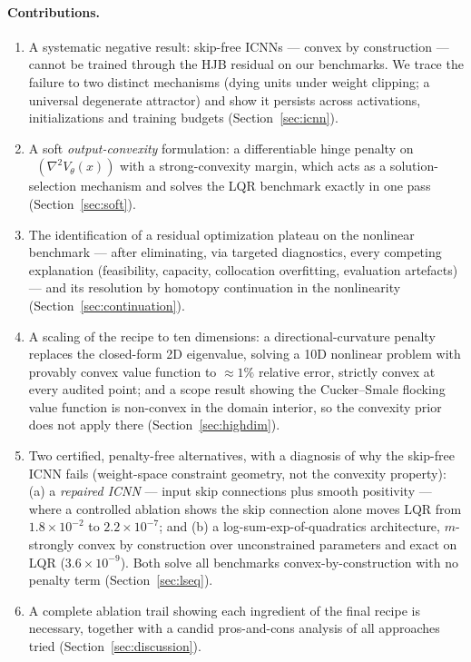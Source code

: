 \documentclass[11pt,a4paper]{article}
\DeclareMathOperator{\lammin}{\lambda_{\min}}
\begin{document}
\paragraph{Contributions.}
\begin{enumerate}[itemsep=1pt]
  \item A systematic negative result: skip-free ICNNs --- convex by
        construction --- cannot be trained through the HJB residual on our
        benchmarks. We trace the failure to two distinct mechanisms (dying
        units under weight clipping; a universal degenerate attractor) and
        show it persists across activations, initializations and training
        budgets (Section~\ref{sec:icnn}).
  \item A soft \emph{output-convexity} formulation: a differentiable hinge
        penalty on $\lammin(\nabla^2 V_\theta(x))$ with a strong-convexity
        margin, which acts as a solution-selection mechanism and solves the
        LQR benchmark exactly in one pass (Section~\ref{sec:soft}).
  \item The identification of a residual optimization plateau on the
        nonlinear benchmark --- after eliminating, via targeted diagnostics,
        every competing explanation (feasibility, capacity, collocation
        overfitting, evaluation artefacts) --- and its resolution by homotopy
        continuation in the nonlinearity (Section~\ref{sec:continuation}).
  \item A scaling of the recipe to ten dimensions: a directional-curvature
        penalty replaces the closed-form 2D eigenvalue, solving a 10D
        nonlinear problem with provably convex value function to
        $\approx 1\%$ relative error, strictly convex at every audited
        point; and a scope result showing the Cucker--Smale flocking value
        function is non-convex in the domain interior, so the convexity
        prior does not apply there (Section~\ref{sec:highdim}).
  \item Two certified, penalty-free alternatives, with a diagnosis of why the
        skip-free ICNN fails (weight-space constraint geometry, not the
        convexity property): (a) a \emph{repaired ICNN} --- input skip
        connections plus smooth positivity --- where a controlled ablation
        shows the skip connection alone moves LQR from $1.8\times10^{-2}$ to
        $2.2\times10^{-7}$; and (b) a log-sum-exp-of-quadratics architecture,
        $m$-strongly convex by construction over unconstrained parameters and
        exact on LQR ($3.6\times10^{-9}$). Both solve all benchmarks
        convex-by-construction with no penalty term (Section~\ref{sec:lseq}).
  \item A complete ablation trail showing each ingredient of the final
        recipe is necessary, together with a candid pros-and-cons analysis
        of all approaches tried (Section~\ref{sec:discussion}).
\end{enumerate}
\end{document}
